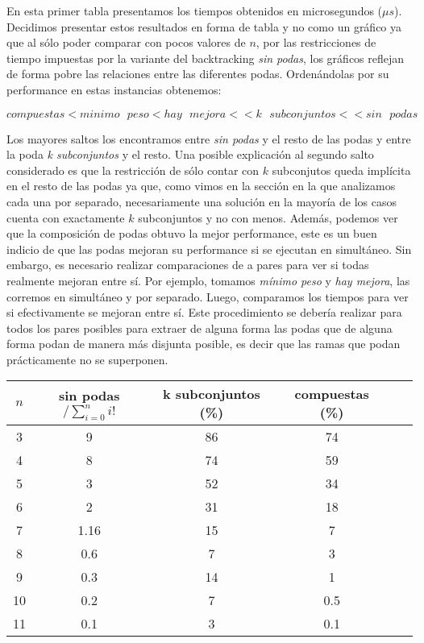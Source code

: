 En esta primer tabla presentamos los tiempos obtenidos en microsegundos ($\mu s$). Decidimos presentar estos resultados
en forma de tabla y no como un gráfico ya que al sólo poder comparar con pocos valores de $n$, por las restricciones de
tiempo impuestas por la variante del backtracking \textit{sin podas}, los gráficos reflejan de forma pobre las relaciones
entre las diferentes podas. Ordenándolas por su performance en estas instancias obtenemos:

\begin{displaymath}
  compuestas < minimo\text{ }peso < hay\text{ }mejora << k\text{ }subconjuntos << sin\text{ }podas
\end{displaymath}

Los mayores saltos los encontramos entre \textit{sin podas} y el resto de las podas y entre la poda \textit{k subconjuntos}
y el resto. Una posible explicación al segundo salto considerado es que la restricción de sólo contar con $k$ subconjutos
queda implícita en el resto de las podas ya que, como vimos en la sección en la que analizamos cada una por separado,
necesariamente una solución en la mayoría de los casos cuenta con exactamente $k$ subconjuntos y no con menos. Además, 
podemos ver que la composición de podas obtuvo la mejor performance, este es un buen indicio de que las podas mejoran
su performance si se ejecutan en simultáneo. Sin embargo, es necesario realizar comparaciones de a pares para ver 
si todas realmente mejoran entre sí. Por ejemplo, tomamos \textit{mínimo peso} y \textit{hay mejora}, las corremos 
en simultáneo y por separado. Luego, comparamos los tiempos para ver si efectivamente se mejoran entre sí. Este
procedimiento se debería realizar para todos los pares posibles para extraer de alguna forma las podas que de alguna
forma podan de manera más disjunta posible, es decir que las ramas que podan prácticamente no se superponen.

\begin{center}
  \begin{tabular}{ c | c | c | c | c | c}
    $n$ & sin podas$ / \sum_{i=0}^ni!$ & k subconjuntos (\%) & compuestas (\%) \tabularnewline \hline
    3 & 9 & 86 & 74 \tabularnewline \hline
    4 & 8 & 74 & 59 \tabularnewline \hline
    5 & 3 & 52 & 34 \tabularnewline \hline
    6 & 2 & 31 & 18 \tabularnewline \hline 
    7 & 1.16 & 15 & 7 \tabularnewline \hline 
    8 & 0.6 & 7 & 3 \tabularnewline \hline
    9 & 0.3 & 14 & 1 \tabularnewline \hline
    10 & 0.2  & 7 & 0.5 \tabularnewline \hline
    11 & 0.1 & 3 & 0.1
  \end{tabular}
\end{center}

